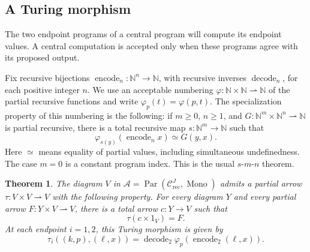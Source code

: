 \documentclass[11pt]{article}
\newtheorem{theorem}{Theorem}[section]
\newcommand{\N}{\mathbb N}
\begin{document}
\subsection{A Turing morphism}\label{app:fork-turing}

The two endpoint programs of a central program will compute its
endpoint values. A central computation is accepted only when
these programs agree with its proposed output.

Fix recursive bijections
$\operatorname{encode}_n:\N^n\to\N$, with recursive inverses
$\operatorname{decode}_n$, for each positive integer $n$.
We use an acceptable numbering
$\varphi:\N\times\N\rightharpoonup\N$ of the partial recursive
functions and write $\varphi_p(t)=\varphi(p,t)$.
The specialization property of this numbering is the following:
if $m\geq0$, $n\geq1$, and
$G:\N^m\times\N^n\rightharpoonup\N$ is partial recursive,
there is a total recursive map $s:\N^m\to\N$ such that
\[
 \varphi_{s(y)}(\operatorname{encode}_n x)\simeq G(y,x).
\]
Here $\simeq$ means equality of partial values,
including simultaneous undefinedness. The case $m=0$ is a
constant program index. This is the usual $s$-$m$-$n$ theorem.

\begin{theorem}\label{thm:fork-turing}
The diagram $V$ in
$\mathcal A=\operatorname{Par}(\mathcal C_{\mathrm{rec}}^J,
\operatorname{Mono})$ admits a partial arrow
$\tau:V\times V\rightharpoonup V$ with the following property.
For every diagram $Y$ and every partial arrow
$F:Y\times V\rightharpoonup V$, there is a total arrow
$c:Y\to V$ such that
\[
 \tau(c\times1_V)=F.
\]
At each endpoint $i=1,2$, this Turing morphism is given by
\begin{equation}\label{eq:fork-turing-endpoint}
 \tau_i((k,p),(\ell,x))
 =\operatorname{decode}_2
     \varphi_p(\operatorname{encode}_2(\ell,x)).
\end{equation}
\end{theorem}
\end{document}

